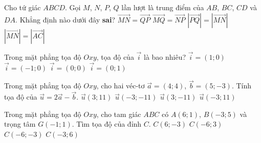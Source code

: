 \begin{ex}%
	Cho tứ giác $ABCD$. Gọi $M$, $N$, $P$, $Q$ lần lượt là trung điểm của $AB$, $BC$, $CD$ và $DA$. Khẳng định nào dưới đây \textbf{sai}?
	\choice
	{$\vec{MN} = \vec{QP}$}
	{$\vec{MQ} = \vec{NP}$}
	{$|\vec{PQ}| = |\vec{MN}|$}
	{\True $|\vec{MN}| = |\vec{AC}|$}
\end{ex}
\begin{ex}%
	Trong mặt phẳng tọa độ $Oxy$, tọa độ của $\vec{i}$ là bao nhiêu?
	\choice
	{\True $\vec{i} = (1; 0)$}
	{$\vec{i} = (-1; 0)$}
	{$\vec{i} = (0; 0)$}
	{$\vec{i} = (0; 1)$}
\end{ex}
\begin{ex}%
	Trong mặt phẳng tọa độ $Oxy$, cho hai véc-tơ $\vec{a} = (4; 4)$, $\vec{b} = (5; -3)$. Tính tọa độ của $\vec{u} = 2\vec{a} - \vec{b}$.
	\choice
	{\True $\vec{u}(3; 11)$}
	{$\vec{u}(-3; -11)$}
	{$\vec{u}(3; -11)$}
	{$\vec{u}(-3; 11)$}
\end{ex}
\begin{ex}%
	Trong mặt phẳng tọa độ $Oxy$, cho tam giác $ABC$ có $A(6; 1)$, $B(-3; 5)$ và trọng tâm $G(-1; 1)$. Tìm tọa độ của đỉnh $C$.
	\choice
	{$C(6; -3)$}
	{$C(-6; 3)$}
	{\True $C(-6; -3)$}
	{$C(-3; 6)$}
\end{ex}

